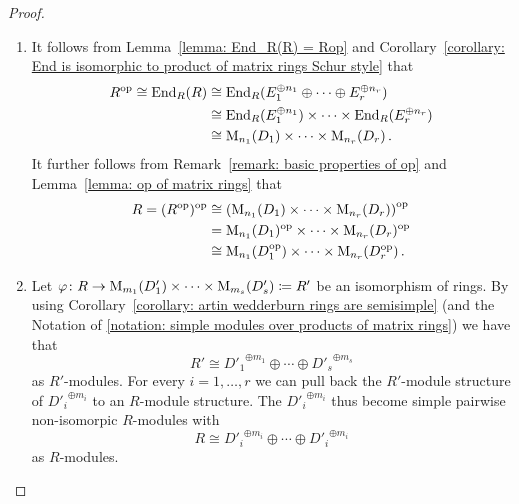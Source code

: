 \begin{proof}
  \leavevmode
  \begin{enumerate}
    \item
      It follows from Lemma~\ref{lemma: End_R(R) = Rop} and Corollary~\ref{corollary: End is isomorphic to product of matrix rings Schur style} that
      \begin{align*}
                R^{\operatorname{op}}
         \cong  \operatorname{End}_R(R)
        &\cong  \operatorname{End}_R(E_1^{\oplus n_1} \oplus \dotsb \oplus E_r^{\oplus n_r})  \\
        &\cong  \operatorname{End}_R(E_1^{\oplus n_1}) \times \dotsb \times \operatorname{End}_R(E_r^{\oplus n_r})  \\
        &\cong  \operatorname{M}_{n_1}(D_1) \times \dotsb \times \operatorname{M}_{n_r}(D_r) \,.
      \end{align*}
      It further follows from Remark~\ref{remark: basic properties of op} and Lemma~\ref{lemma: op of matrix rings} that
      \begin{align*}
                R
        =       (R^{\operatorname{op}})^{\operatorname{op}}
        &\cong  \left( \operatorname{M}_{n_1}(D_1) \times \dotsb \times \operatorname{M}_{n_r}(D_r) \right)^{\operatorname{op}} \\
        &=      \operatorname{M}_{n_1}(D_1)^{\operatorname{op}} \times \dotsb \times \operatorname{M}_{n_r}(D_r)^{\operatorname{op}}  \\
        &\cong  \operatorname{M}_{n_1}(D_1^{\operatorname{op}}) \times \dotsb \times \operatorname{M}_{n_r}(D_r^{\operatorname{op}}) \,.
      \end{align*}
    \item
      Let $\varphi \colon R \to \operatorname{M}_{m_1}(D'_1) \times \dotsb \times \operatorname{M}_{m_s}(D'_s) \coloneqq R'$ be an isomorphism of rings.
      By using Corollary~\ref{corollary: artin wedderburn rings are semisimple} (and the Notation of \ref{notation: simple modules over products of matrix rings}) we have that
      \[
              R'
        \cong {D'_1}^{\oplus m_1} \oplus \dotsb \oplus {D'_s}^{\oplus m_s}
      \]
      as $R'$-modules.
      For every $i = 1, \dotsc, r$ we can pull back the $R'$-module structure of ${D'_i}^{\oplus m_i}$ to an $R$-module structure.
      The ${D'_i}^{\oplus m_i}$ thus become simple pairwise non-isomorpic $R$-modules with
      \[
              R
        \cong {D'_i}^{\oplus m_i} \oplus \dotsb \oplus {D'_i}^{\oplus m_i}
      \]
      as $R$-modules.
      

\end{enumerate}
\end{proof}
